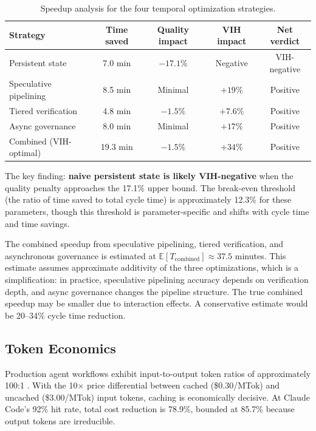 \documentclass[11pt, a4paper, copyright]{googledeepmind}
\newcommand{\E}{\mathbb{E}}
\begin{document}
\begin{table}[ht]
\centering
\caption{Speedup analysis for the four temporal optimization strategies.}\label{tab:speedup}
\begin{tabular}{lcccc}
\toprule
Strategy & Time saved & Quality impact & VIH impact & Net verdict \\
\midrule
Persistent state & 7.0 min & $-17.1\%$ & Negative & VIH-negative \\
Speculative pipelining & 8.5 min & Minimal & $+19\%$ & Positive \\
Tiered verification & 4.8 min & $-1.5\%$ & $+7.6\%$ & Positive \\
Async governance & 8.0 min & Minimal & $+17\%$ & Positive \\
\midrule
Combined (VIH-optimal) & 19.3 min & $-1.5\%$ & $+34\%$ & Positive \\
\bottomrule
\end{tabular}
\end{table}

The key finding: \textbf{naive persistent state is likely VIH-negative} when the quality penalty approaches the 17.1\% upper bound. The break-even threshold (the ratio of time saved to total cycle time) is approximately 12.3\% for these parameters, though this threshold is parameter-specific and shifts with cycle time and time savings.

The combined speedup from speculative pipelining, tiered verification, and asynchronous governance is estimated at $\E[T_{\mathrm{combined}}] \approx 37.5$ minutes. This estimate assumes approximate additivity of the three optimizations, which is a simplification: in practice, speculative pipelining accuracy depends on verification depth, and async governance changes the pipeline structure. The true combined speedup may be smaller due to interaction effects. A conservative estimate would be 20--34\% cycle time reduction.

\subsection{Token Economics}

Production agent workflows exhibit input-to-output token ratios of approximately 100:1 \citep{manus2025context}. With the 10$\times$ price differential between cached (\$0.30/MTok) and uncached (\$3.00/MTok) input tokens, caching is economically decisive. At Claude Code's 92\% hit rate, total cost reduction is 78.9\%, bounded at 85.7\% because output tokens are irreducible.
\end{document}
